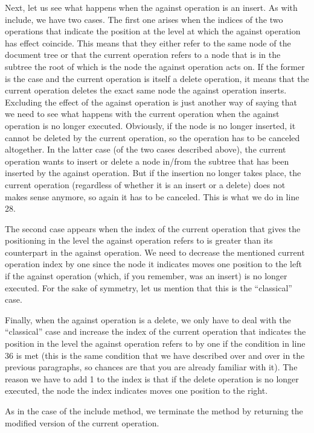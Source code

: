 Next, let us see what happens when the against operation is an insert. As with include,
we have two cases. The first one arises when the indices of the two operations that indicate
the position at the level at which the against operation has effect coincide.
This means that they either refer to the same node of the document tree or that the
current operation refers to a node that is in the subtree the root of which is the node
the against operation acts on. If the former is the case and the current
operation is itself a delete operation, it means that the current operation deletes
the exact same node the against operation inserts. Excluding the effect of the against
operation is just another way of saying that we need to see what happens with the current operation
when the against operation is no longer executed. Obviously, if the node is no longer
inserted, it cannot be deleted by the current operation, so the operation has to be
canceled altogether. In the latter case (of the two cases described above), the current
operation wants to insert or delete a node in/from the subtree that has been inserted
by the against operation. But if the insertion no longer takes place, the current
operation (regardless of whether it is an insert or a delete) does not makes sense
anymore, so again it has to be canceled. This is what we do in line 28.

The second case appears when the index of the current operation that gives the positioning
in the level the against operation refers to is greater than its counterpart in the
against operation. We need to decrease the mentioned current operation index by one
since the node it indicates moves one position to the left if the against operation
(which, if you remember, was an insert) is no longer executed. For the sake of symmetry,
let us mention that this is the ``classical'' case.

Finally, when the against operation is a delete, we only have to deal with the
``classical'' case and increase the index of the current operation that indicates the
position in the level the against operation refers to by one if the condition in
line 36 is met (this is the same condition that we have described over and over in the
previous paragraphs, so chances are that you are already familiar with it). The reason
we have to add 1 to the index is that if the delete operation is no longer executed,
the node the index indicates moves one position to the right.

As in the case of the include method, we terminate the method by returning the modified
version of the current operation.

